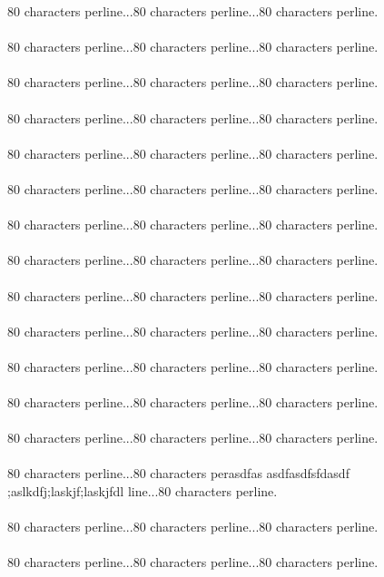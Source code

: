 {{{{80 characters perline...80 characters perline...80 characters perline.\asdf\\\\
80 characters perline...80 characters perline...80 characters perline.\asdf\\\\
80 characters perline...80 characters perline...80 characters perline.\asdf\\\\
80 characters perline...80 characters perline...80 characters perline.\asdf\\\\
80 characters perline...80 characters perline...80 characters perline.\asdf\\\\
80 characters perline...80 characters perline...80 characters perline.\asdf\\\\
80 characters perline...80 characters perline...80 characters perline.\asdf\\\\
80 characters perline...80 characters perline...80 characters perline.\asdf\\\\
80 characters perline...80 characters perline...80 characters perline.\asdf\\\\
80 characters perline...80 characters perline...80 characters perline.\asdf\\\\
80 characters perline...80 characters perline...80 characters perline.\asdf\\\\
80 characters perline...80 characters perline...80 characters perline.\asdf\\\\
80 characters perline...80 characters perline...80 characters perline.\asdf\\\\
80 characters perline...80 characters perasdfas
asdfasdfsfdasdf ;aslkdfj;laskjf;laskjfdl
line...80 characters perline.\asdf\\\\
80 characters perline...80 characters perline...80 characters perline.\asdf\\\\
80 characters perline...80 characters perline...80 characters perline.\asdf\\\\
}}}}
